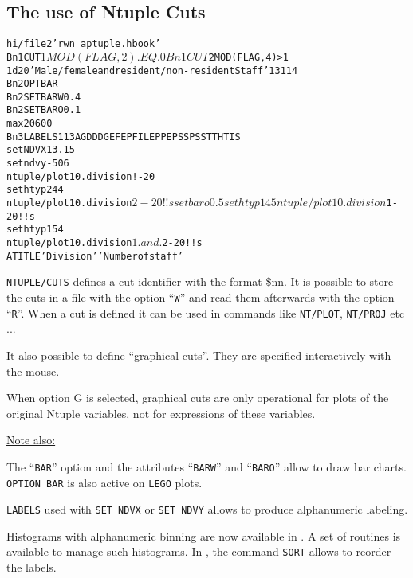 \clearpage

\subsection{The use of Ntuple Cuts}

\begin{alltt}
      hi/file 2 'rwn_aptuple.hbook'
Bn1        CUT $1 MOD(FLAG,2).EQ.0
Bn1        CUT $2 MOD(FLAG,4)>1
      1d 20 'Male/female and resident/non-resident Staff' 13 1 14
Bn2        OPT BAR
Bn2        SET BARW 0.4
Bn2        SET BARO 0.1
      max 20 600
Bn3        LABELS 1 13 AG DD DG EF EP FI LEP PE PS SPS ST TH TIS
      set NDVX 13.15
      set ndvy -506
      ntuple/plot 10.division ! -20
      set htyp 244
      ntuple/plot 10.division $2 -20 ! ! s
      set baro 0.5
      set htyp 145
      ntuple/plot 10.division $1 -20 ! ! s
      set htyp 154
      ntuple/plot 10.division $1.and.$2 -20 ! ! s
      ATITLE 'Division' 'Number of staff'
\end{alltt} 
\begin{DinglistE}
\item {\tt NTUPLE/CUTS} defines a cut identifier with the format \$nn.
      It is possible to store the cuts in a file with the option ``{\tt W}''
      and read them afterwards with the option ``{\tt R}''. When a cut is
      defined it can be used in commands like {\tt NT/PLOT}, {\tt NT/PROJ}
      etc ...

      It also possible to define ``graphical cuts''. They are specified
      interactively with the mouse.

      When option G is selected, graphical cuts are only operational for
      plots of the original Ntuple variables, not for expressions of these
      variables.

\underline{Note also:}

\item The ``{\tt BAR}'' option and the attributes ``{\tt BARW}'' and
      ``{\tt BARO}'' allow to draw bar charts. {\tt OPTION BAR} is also
      active on {\tt LEGO} plots.
\item {\tt LABELS} used with {\tt SET NDVX} or {\tt SET NDVY} allows to
      produce alphanumeric labeling.
\item Histograms with alphanumeric binning are now available in \HBOOK.
      A set of routines is available to manage such histograms.
      In \PAW, the command {\tt SORT} allows to reorder the labels.
\end{DinglistE}

